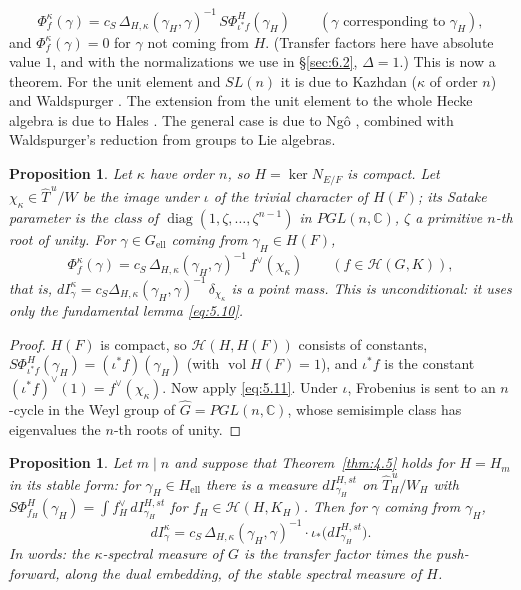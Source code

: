 \documentclass[12pt,letterpaper]{article}
\numberwithin{equation}{section}
\theoremstyle{plain}
\newtheorem{proposition}[lemma]{Proposition}
\theoremstyle{remark}
\theoremstyle{plain}
\theoremstyle{definition}
\theoremstyle{remark}
\theoremstyle{remark}
\newcommand{\Hc}{\mathcal{H}}
\newcommand{\Thu}{\widehat{T}^{\,u}}
\DeclareMathOperator{\vol}{vol}
\DeclareMathOperator{\diag}{diag}
\newcommand{\ellr}{\mathrm{ell}}
\begin{document}
\begin{equation}\label{eq:5.11}
\Phi^\kappa_f(\gamma)=c_S\,\Delta_{H,\kappa}(\gamma_H,\gamma)^{-1}\,S\Phi^H_{\iota^*f}(\gamma_H)\qquad(\gamma\text{ corresponding to }\gamma_H),
\end{equation}
and $\Phi^\kappa_f(\gamma)=0$ for $\gamma$ not coming from $H$. (Transfer factors here have absolute value $1$, and with the normalizations we use in \S\ref{sec:6.2}, $\Delta=1$.) This is now a theorem. For the unit element and $SL(n)$ it is due to Kazhdan \cite{Ka84} ($\kappa$ of order $n$) and Waldspurger \cite{Wa91}. The extension from the unit element to the whole Hecke algebra is due to Hales \cite{Ha95}. The general case is due to Ng\^o \cite{Ng10}, combined with Waldspurger's reduction from groups to Lie algebras.

\begin{proposition}\label{prop:5.1}
Let $\kappa$ have order $n$, so $H=\ker N_{E/F}$ is compact. Let $\chi_\kappa\in\Thu/W$ be the image under $\iota$ of the trivial character of $H(F)$; its Satake parameter is the class of $\diag(1,\zeta,\dots,\zeta^{n-1})$ in $PGL(n,\mathbb{C})$, $\zeta$ a primitive $n$-th root of unity. For $\gamma\in G_{\ellr}$ coming from $\gamma_H\in H(F)$,
\[
\Phi^\kappa_f(\gamma)=c_S\,\Delta_{H,\kappa}(\gamma_H,\gamma)^{-1}\,f^\vee(\chi_\kappa)\qquad(f\in\Hc(G,K)),
\]
that is, $dI^\kappa_\gamma=c_S\Delta_{H,\kappa}(\gamma_H,\gamma)^{-1}\,\delta_{\chi_\kappa}$ is a point mass. This is unconditional: it uses only the fundamental lemma \eqref{eq:5.10}.
\end{proposition}

\begin{proof}
$H(F)$ is compact, so $\Hc(H,H(F))$ consists of constants, $S\Phi^H_{\iota^*f}(\gamma_H)=(\iota^*f)(\gamma_H)$ (with $\vol H(F)=1$), and $\iota^*f$ is the constant $(\iota^*f)^\vee(1)=f^\vee(\chi_\kappa)$. Now apply \eqref{eq:5.11}. Under $\iota$, Frobenius is sent to an $n$-cycle in the Weyl group of $\hat G=PGL(n,\mathbb{C})$, whose semisimple class has eigenvalues the $n$-th roots of unity.
\end{proof}

\begin{proposition}\label{prop:5.2}
Let $m\mid n$ and suppose that Theorem~\ref{thm:4.5} holds for $H=H_m$ in its stable form: for $\gamma_H\in H_{\ellr}$ there is a measure $dI^{H,st}_{\gamma_H}$ on $\Thu_H/W_H$ with $S\Phi^H_{f_H}(\gamma_H)=\int f_H^\vee\,dI^{H,st}_{\gamma_H}$ for $f_H\in\Hc(H,K_H)$. Then for $\gamma$ coming from $\gamma_H$,
\[
dI^\kappa_\gamma=c_S\,\Delta_{H,\kappa}(\gamma_H,\gamma)^{-1}\cdot\iota_*\big(dI^{H,st}_{\gamma_H}\big).
\]
In words: the $\kappa$-spectral measure of $G$ is the transfer factor times the push-forward, along the dual embedding, of the stable spectral measure of $H$.
\end{proposition}
\end{document}
